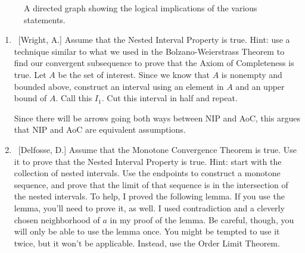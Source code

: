 \documentclass[10pt]{article}
\theoremstyle{definition}
\begin{document}
\begin{enumerate}
	\begin{figure}[h]
	\begin{center}
	\caption{A directed graph showing the logical implications of the various statements.}\label{fig:theorems}
	\end{center}
	\end{figure}
	

	\begin{enumerate}
	
	\item  ~[Wright, A.] Assume that the Nested Interval Property is true.  Hint: use a technique similar to what we used in the Bolzano-Weierstrass Theorem to find our convergent subsequence to prove that the Axiom of Completeness is true.  Let $A$ be the set of interest.  Since we know that $A$ is nonempty and bounded above, construct an interval using an element in $A$ and an upper bound of $A$.  Call this $I_1$.  Cut this interval in half and repeat.  
	
	Since there will be arrows going both ways between NIP and AoC, this argues that NIP and AoC are equivalent assumptions.
	
	\item  ~[Delfosse, D.] Assume that the Monotone Convergence Theorem is true.  Use it to prove that the Nested Interval Property is true.  Hint: start with the collection of nested intervals.  Use the endpoints to construct a monotone sequence, and prove that the limit of that sequence is in the intersection of the nested intervals.  To help, I proved the following lemma.  If you use the lemma, you'll need to prove it, as well.  I used contradiction and a cleverly chosen neighborhood of $a$ in my proof of the lemma.  Be careful, though, you will only be able to use the lemma once.  You might be tempted to use it twice, but it won't be applicable.  Instead, use the Order Limit Theorem.
	

\end{enumerate}
\end{enumerate}
\end{document}
